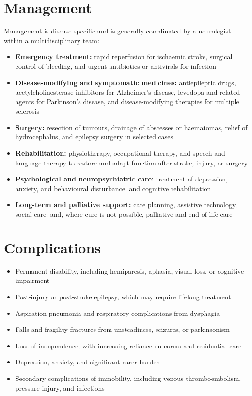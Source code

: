 \section*{Management}
Management is disease-specific and is generally coordinated by a neurologist within a multidisciplinary team:

\begin{itemize}
    \item \textbf{Emergency treatment:} rapid reperfusion for ischaemic stroke, surgical control of bleeding, and urgent antibiotics or antivirals for infection
    \item \textbf{Disease-modifying and symptomatic medicines:} antiepileptic drugs, acetylcholinesterase inhibitors for Alzheimer's disease, levodopa and related agents for Parkinson's disease, and disease-modifying therapies for multiple sclerosis
    \item \textbf{Surgery:} resection of tumours, drainage of abscesses or haematomas, relief of hydrocephalus, and epilepsy surgery in selected cases
    \item \textbf{Rehabilitation:} physiotherapy, occupational therapy, and speech and language therapy to restore and adapt function after stroke, injury, or surgery
    \item \textbf{Psychological and neuropsychiatric care:} treatment of depression, anxiety, and behavioural disturbance, and cognitive rehabilitation
    \item \textbf{Long-term and palliative support:} care planning, assistive technology, social care, and, where cure is not possible, palliative and end-of-life care
\end{itemize}

\section*{Complications}
\begin{itemize}
    \item Permanent disability, including hemiparesis, aphasia, visual loss, or cognitive impairment
    \item Post-injury or post-stroke epilepsy, which may require lifelong treatment
    \item Aspiration pneumonia and respiratory complications from dysphagia
    \item Falls and fragility fractures from unsteadiness, seizures, or parkinsonism
    \item Loss of independence, with increasing reliance on carers and residential care
    \item Depression, anxiety, and significant carer burden
    \item Secondary complications of immobility, including venous thromboembolism, pressure injury, and infections
\end{itemize}

